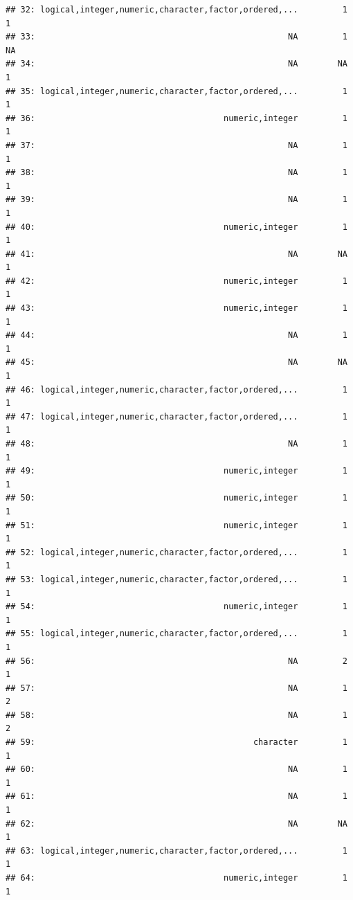 \documentclass[
]{scrbook}
\begin{document}
\begin{verbatim}
## 32: logical,integer,numeric,character,factor,ordered,...         1          1
## 33:                                                   NA         1         NA
## 34:                                                   NA        NA          1
## 35: logical,integer,numeric,character,factor,ordered,...         1          1
## 36:                                      numeric,integer         1          1
## 37:                                                   NA         1          1
## 38:                                                   NA         1          1
## 39:                                                   NA         1          1
## 40:                                      numeric,integer         1          1
## 41:                                                   NA        NA          1
## 42:                                      numeric,integer         1          1
## 43:                                      numeric,integer         1          1
## 44:                                                   NA         1          1
## 45:                                                   NA        NA          1
## 46: logical,integer,numeric,character,factor,ordered,...         1          1
## 47: logical,integer,numeric,character,factor,ordered,...         1          1
## 48:                                                   NA         1          1
## 49:                                      numeric,integer         1          1
## 50:                                      numeric,integer         1          1
## 51:                                      numeric,integer         1          1
## 52: logical,integer,numeric,character,factor,ordered,...         1          1
## 53: logical,integer,numeric,character,factor,ordered,...         1          1
## 54:                                      numeric,integer         1          1
## 55: logical,integer,numeric,character,factor,ordered,...         1          1
## 56:                                                   NA         2          1
## 57:                                                   NA         1          2
## 58:                                                   NA         1          2
## 59:                                            character         1          1
## 60:                                                   NA         1          1
## 61:                                                   NA         1          1
## 62:                                                   NA        NA          1
## 63: logical,integer,numeric,character,factor,ordered,...         1          1
## 64:                                      numeric,integer         1          1

\end{verbatim}
\end{document}
